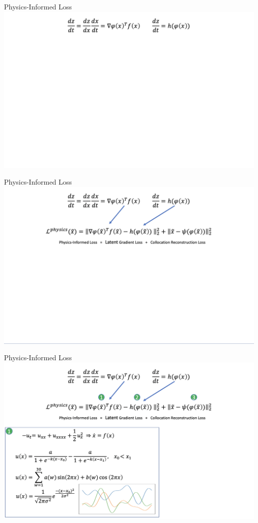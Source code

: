 \documentclass[8pt]{beamer}
\begin{document}
\begin{frame}{Physics-Informed Loss}
	\includegraphics[width=\textwidth]{Figures/collocations_2.png}
\end{frame}

\begin{frame}{Physics-Informed Loss}
	\includegraphics[width=\textwidth]{Figures/collocations_3.png}
\end{frame}

\begin{frame}{Physics-Informed Loss}
	\includegraphics[width=\textwidth]{Figures/collocations_4.png}
\end{frame}
\end{document}
